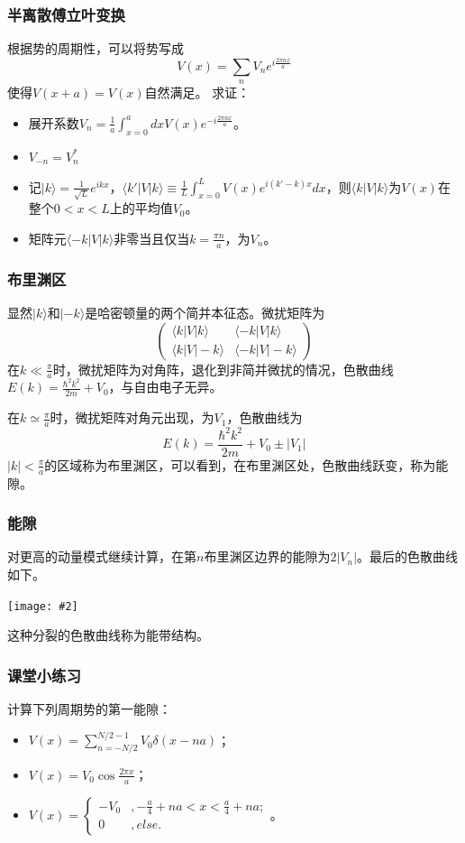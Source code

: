 \documentclass[CJK]{beamer}
\newcommand{\cpic}[2]{
\begin{center}
\texttt{[image: \#2]}
\end{center}
}
\begin{document}
\begin{frame}
\frametitle{\bch 半离散傅立叶变换 \ech}
\bch
根据势的周期性，可以将势写成
$$
V(x) = \sum_n V_n e^{i\frac{2\pi n x}{a}}
$$
使得$V(x+a) = V(x)$自然满足。
求证：
\begin{itemize}
\item 展开系数$V_n = \frac{1}{a} \int_{x=0}^a dx V(x) e^{-i\frac{2\pi n x}{a}}$。
\item $V_{-n} = V_n^*$
\item 记$|k\rangle = \frac{1}{\sqrt{L}}e^{ikx}$，$\langle k' | V | k \rangle \equiv \frac{1}{L} \int_{x=0}^L V(x) e^{i(k'-k)x} dx$，则$\langle k | V | k \rangle$为$V(x)$在整个$0<x<L$上的平均值$V_0$。
\item 矩阵元$\langle -k | V | k \rangle$非零当且仅当$k =\frac{\pi n}{a}$，为$V_n$。
\end{itemize}
\ech
\end{frame}


\begin{frame}
\frametitle{\bch 布里渊区 \ech}
\bch
显然$|k\rangle$和$|-k \rangle$是哈密顿量的两个简并本征态。微扰矩阵为
$$
\begin{pmatrix}
\langle k | V | k \rangle & \langle -k | V | k \rangle \\
\langle k | V | -k \rangle & \langle -k | V | -k \rangle
\end{pmatrix}
$$
在$k \ll \frac{\pi}{a}$时，微扰矩阵为对角阵，退化到非简并微扰的情况，色散曲线$E(k) = \frac{\hbar^2 k^2}{2m} + V_0$，与自由电子无异。
\par
在$k \simeq \frac{\pi}{a}$时，微扰矩阵对角元出现，为$V_1$，色散曲线为
$$
E(k) = \frac{\hbar^2 k^2}{2m} + V_0 \pm |V_1|
$$
$|k| < \frac{\pi}{a}$的区域称为布里渊区，可以看到，在布里渊区处，色散曲线跃变，称为能隙。
\ech
\end{frame}

\begin{frame}
\frametitle{\bch 能隙 \ech}
\bch
对更高的动量模式继续计算，在第$n$布里渊区边界的能隙为$2|V_n|$。最后的色散曲线如下。
\cpic{0.35}{energy_gap}
这种分裂的色散曲线称为能带结构。
\ech
\end{frame}

\begin{frame}
\frametitle{\bch 课堂小练习 \ech}
\bch
计算下列周期势的第一能隙：
\begin{itemize}
\item $V(x) = \sum_{n=-N/2}^{N/2-1} V_0 \delta(x - na)$；
\item $V(x) = V_0 \cos \frac{2\pi x}{a}$；
\item $V(x) = \begin{cases} -V_0 &,-\frac{a}{4} + na < x < \frac{a}{4} + na; \\ 0 &,else. \end{cases}$。
\end{itemize}
\ech
\end{frame}
\end{document}
